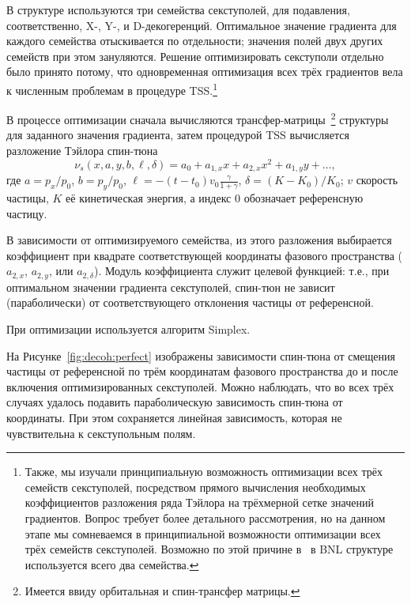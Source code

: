 В структуре используются три семейства секступолей, для подавления, соответственно, X-, Y-, и D-декогеренций.
Оптимальное значение градиента для каждого семейства отыскивается по отдельности; значения полей двух
других семейств при этом зануляются. Решение оптимизировать секступоли отдельно было принято потому, что
одновременная оптимизация всех трёх градиентов вела к численным проблемам в процедуре TSS.\footnote{Также,
мы изучали принципиальную возможность оптимизации всех трёх семейств секступолей, посредством прямого
вычисления необходимых коэффициентов разложения ряда Тэйлора на трёхмерной сетке значений градиентов. 
Вопрос требует более детального рассмотрения, но на данном этапе мы сомневаемся в принципиальной возможности
оптимизации всех трёх семейств секступолей. Возможно по этой причине в~\cite[стр.~219]{Eremey:Thesis} в BNL структуре
используется всего два семейства.}

В процессе оптимизации сначала вычисляются трансфер-матрицы~\footnote{Имеется ввиду орбитальная и
	 спин-трансфер матрицы.} структуры для заданного значения градиента, 
затем процедурой TSS вычисляется разложение Тэйлора спин-тюна 
\begin{equation*}
\nu_s(x,a,y,b,\ell,\delta) = a_0 + a_{1,x}x + a_{2,x}x^2 + a_{1,y}y + \dots,
\end{equation*}
где $a = p_x/p_0$, 
$b=p_y/p_0$, 
$\ell = -(t-t_0)v_0\frac{\gamma}{1+\gamma}$, 
$\delta = (K-K_0)/K_0$; 
$v$ скорость частицы, $K$ её кинетическая энергия, 
а индекс 0 обозначает референсную частицу.~\cite[стр.~9]{COSYINF:Manual:BeamPhys}

В зависимости от оптимизируемого семейства, из этого разложения выбирается коэффициент 
при квадрате соответствующей координаты фазового пространства ($a_{2,x}$, $a_{2,y}$, или $a_{2,\delta}$). 
Модуль коэффициента служит целевой функцией: т.е., 
при оптимальном значении градиента секступолей, спин-тюн не зависит (параболически) от соответствующего отклонения частицы от референсной.

При оптимизации используется алгоритм Simplex.~\cite[стр.~37]{COSYINF:Manual:Programmer}

На Рисунке~\ref{fig:decoh:perfect} изображены зависимости спин-тюна от смещения частицы от референсной по трём
координатам фазового пространства до и после включения оптимизированных секступолей. 
Можно наблюдать, что во всех трёх случаях удалось подавить параболическую зависимость 
спин-тюна от координаты. При этом сохраняется линейная зависимость, 
которая не чувствительна к секступольным полям. 

